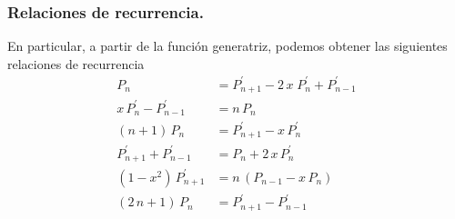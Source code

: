 \subsubsection*{Relaciones de recurrencia.}
En particular, a partir de la función generatriz, podemos obtener las siguientes relaciones de recurrencia
\begin{align*}
P_{n} &= P_{n+1}^{\prime} - 2 \, x \; P_{n}^{\prime} + P_{n-1}^{\prime} \\[1em]
x \, P_{n}^{\prime} - P_{n-1}^{\prime} &=  n \, P_{n} \\[1em]
(n + 1) \, P_{n} &= P_{n+1}^{\prime} - x \, P_{n}^{\prime} \\[1em]
P_{n+1}^{\prime} + P_{n-1}^{\prime} &=  P_{n} + 2 \, x \, P_{n}^{\prime} \\[1em]
(1 - x^{2}) \, P_{n+1}^{\prime} &= n \, (P_{n-1} - x \, P_{n}) \\[1em]
(2 \, n + 1) \, P_{n} &= P_{n+1}^{\prime} - P_{n-1}^{\prime}
\end{align*}
